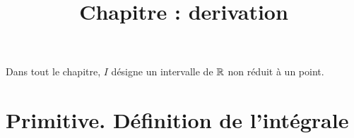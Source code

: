 \documentclass[a4paper, 11pt]{article}
\begin{document}
\tableofcontents
\title{Chapitre : derivation}


Dans tout le chapitre, $I$ d\'esigne un intervalle de $\mathbb{R}$ non r\'eduit \`a un point.

\section{Primitive. D\'efinition de l'int\'egrale}
\end{document}
